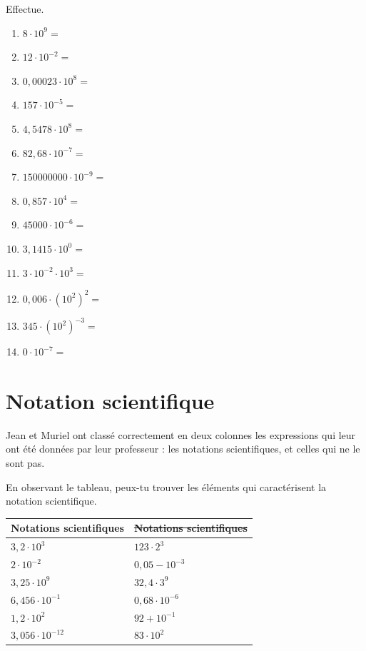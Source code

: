 \documentclass[../../syllabus_2.tex]{subfiles}
\begin{document}
\begin{exercise}
	Effectue.
	\begin{enumerate} [cols=2, itemsep=1.7cm]
		\item \(8\cdot 10^9=\)
		\item \(12\cdot 10^{-2}=\)
		\item \(0,00023\cdot 10^8=\)
		\item \(157\cdot 10^{-5}=\)
		\item \(4,5478\cdot 10^8=\)
		\item \(82,68\cdot 10^{-7}=\)
		\item \(150000000\cdot 10^{-9}=\)
		\item \(0,857\cdot 10^4=\)
		\item \(45000\cdot 10^{-6}=\)
		\item \(3,1415 \cdot 10^0=\)
		\item \(3 \cdot 10^{-2} \cdot 10^3=\)
		\item \(0,006 \cdot (10^2)^2=\)
		\item \(345 \cdot (10^2)^{-3}=\)
		\item \(0 \cdot 10^{-7}=\)
	\end{enumerate}
\end{exercise}

\section{Notation scientifique}
Jean et Muriel ont classé correctement en deux colonnes les expressions qui leur ont été données par leur professeur : les notations scientifiques, et celles qui ne le sont pas.

En observant le tableau, peux-tu trouver les éléments qui caractérisent la notation scientifique.

\begin{center}
	\begin{tabularx}{.8\linewidth}{YY} %
		\toprule
		\textbf{Notations scientifiques} & \textbf{\sout{Notations scientifiques}} \\
		\midrule
		\(3,2\cdot 10^3\)                & \(123\cdot 2^3\)                        \\
		\(2\cdot 10^{-2}\)               & \(0,05 - 10^{-3}\)                      \\
		\(3,25\cdot 10^9\)               & \(32,4\cdot 3^9\)                       \\
		\(6,456 \cdot 10^{-1}\)          & \(0,68\cdot 10^{-6}\)                   \\
		\(1,2\cdot 10^2\)                & \(92 + 10^{-1}\)                        \\
		\(3,056\cdot 10^{-12}\)          & \(83\cdot 10^2\)                        \\
	\end{tabularx}
\end{center}
\end{document}
